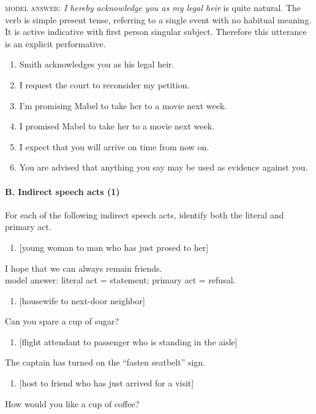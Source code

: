 \textsc{model answer}: \textit{I hereby} \textit{acknowledge you as my legal heir} is quite natural. The verb is simple present tense, referring to a single event with no habitual meaning. It is active indicative with first person singular subject. Therefore this utterance is an explicit performative.


\begin{enumerate}
\item \rmfamily
Smith acknowledges you as his legal heir.
\item \rmfamily
I request the court to reconsider my petition.
\item \rmfamily
I’m promising Mabel to take her to a movie next week.
\item \rmfamily
I promised Mabel to take her to a movie next week.
\item \rmfamily
I expect that you will arrive on time from now on.
\item \rmfamily
You are advised that anything you say may be used as evidence against you.
\end{enumerate}
\paragraph{B. Indirect speech acts (1)}

For each of the following indirect speech acts, identify both the literal and primary act.

\begin{enumerate}
\item \rmfamily
{}[young woman to man who has just prosed to her]
\end{enumerate}

\textrm{I hope that we can always remain friends.\\
}model answer: literal act = statement; primary act = refusal.


\begin{enumerate}
\item \rmfamily
{}[housewife to next-door neighbor]
\end{enumerate}
\rmfamily
Can you spare a cup of sugar?


\begin{enumerate}
\item 
\textrm{[flight attendant to passenger who is standing in the aisle]}
\end{enumerate}
\rmfamily
The captain has turned on the “fasten seatbelt” sign.


\begin{enumerate}
\item 
\textrm{[host to friend who has just arrived for a visit]}
\end{enumerate}
\rmfamily
How would you like a cup of coffee?



